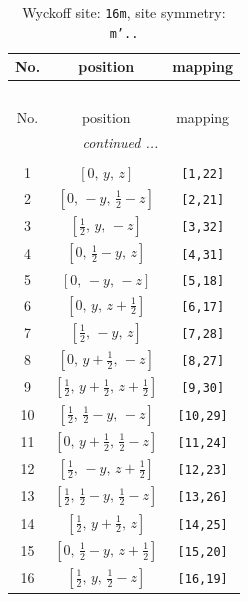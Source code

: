 \documentclass[fleqn,8pt]{jsarticle}
\begin{document}
\renewcommand{\arraystretch}{1.2}
\begin{longtable}{ccc}
\caption{Wyckoff site: {\tt 16m}, site symmetry: {\tt m'..}}
 \\
 \hline \hline
No. & position & mapping \\ \hline \endfirsthead

\multicolumn{2}{l}{\tablename\ \thetable{}} \\
 \hline \hline
No. & position & mapping \\ \hline \endhead

 \hline \hline
\multicolumn{2}{r}{\footnotesize\it continued ...} \\ \endfoot

 \hline \hline
\multicolumn{2}{r}{} \\ \endlastfoot

1 & $\left[ 0,\, y,\, z \right]$ & {\tt [1,22]} \\ \hline
2 & $\left[ 0,\, - y,\, \frac{1}{2} - z \right]$ & {\tt [2,21]} \\ \hline
3 & $\left[ \frac{1}{2},\, y,\, - z \right]$ & {\tt [3,32]} \\ \hline
4 & $\left[ 0,\, \frac{1}{2} - y,\, z \right]$ & {\tt [4,31]} \\ \hline
5 & $\left[ 0,\, - y,\, - z \right]$ & {\tt [5,18]} \\ \hline
6 & $\left[ 0,\, y,\, z + \frac{1}{2} \right]$ & {\tt [6,17]} \\ \hline
7 & $\left[ \frac{1}{2},\, - y,\, z \right]$ & {\tt [7,28]} \\ \hline
8 & $\left[ 0,\, y + \frac{1}{2},\, - z \right]$ & {\tt [8,27]} \\ \hline
9 & $\left[ \frac{1}{2},\, y + \frac{1}{2},\, z + \frac{1}{2} \right]$ & {\tt [9,30]} \\ \hline
10 & $\left[ \frac{1}{2},\, \frac{1}{2} - y,\, - z \right]$ & {\tt [10,29]} \\ \hline
11 & $\left[ 0,\, y + \frac{1}{2},\, \frac{1}{2} - z \right]$ & {\tt [11,24]} \\ \hline
12 & $\left[ \frac{1}{2},\, - y,\, z + \frac{1}{2} \right]$ & {\tt [12,23]} \\ \hline
13 & $\left[ \frac{1}{2},\, \frac{1}{2} - y,\, \frac{1}{2} - z \right]$ & {\tt [13,26]} \\ \hline
14 & $\left[ \frac{1}{2},\, y + \frac{1}{2},\, z \right]$ & {\tt [14,25]} \\ \hline
15 & $\left[ 0,\, \frac{1}{2} - y,\, z + \frac{1}{2} \right]$ & {\tt [15,20]} \\ \hline
16 & $\left[ \frac{1}{2},\, y,\, \frac{1}{2} - z \right]$ & {\tt [16,19]} \\
\end{longtable}
\end{document}
